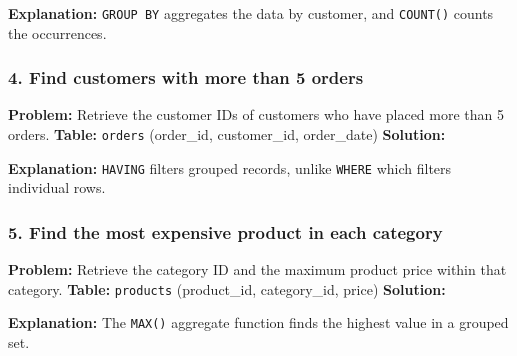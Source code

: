 \textbf{Explanation:} \texttt{GROUP\ BY} aggregates the data by
customer, and \texttt{COUNT()} counts the occurrences.

\subsubsection{4. Find customers with more than 5
orders}\label{find-customers-with-more-than-5-orders}

\textbf{Problem:} Retrieve the customer IDs of customers who have placed
more than 5 orders. \textbf{Table:} \texttt{orders} (order\_id,
customer\_id, order\_date) \textbf{Solution:}

\begin{Shaded}
\begin{Highlighting}[]
 
 \OperatorTok{\textgreater{}} \NormalTok{;}
\end{Highlighting}
\end{Shaded}

\textbf{Explanation:} \texttt{HAVING} filters grouped records, unlike
\texttt{WHERE} which filters individual rows.

\subsubsection{5. Find the most expensive product in each
category}\label{find-the-most-expensive-product-in-each-category}

\textbf{Problem:} Retrieve the category ID and the maximum product price
within that category. \textbf{Table:} \texttt{products} (product\_id,
category\_id, price) \textbf{Solution:}

\begin{Shaded}
\begin{Highlighting}[]
 
\end{Highlighting}
\end{Shaded}

\textbf{Explanation:} The \texttt{MAX()} aggregate function finds the
highest value in a grouped set.

